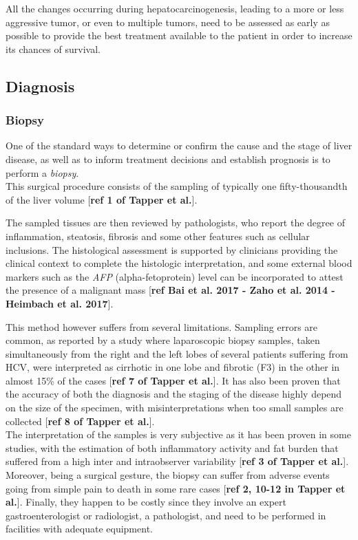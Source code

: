 \documentclass[]{article}
\begin{document}
All the changes occurring during hepatocarcinogenesis, leading to a more
or less aggressive tumor, or even to multiple tumors, need to be
assessed as early as possible to provide the best treatment available to
the patient in order to increase its chances of survival.

\subsection{Diagnosis}\label{diagnosis}

\subsubsection{Biopsy}\label{biopsy}

One of the standard ways to determine or confirm the cause and the stage
of liver disease, as well as to inform treatment decisions and establish
prognosis is to perform a \emph{biopsy}.\\
This surgical procedure consists of the sampling of typically one
fifty-thousandth of the liver volume {[}\textbf{ref 1 of Tapper et
al.}{]}.

The sampled tissues are then reviewed by pathologists, who report the
degree of inflammation, steatosis, fibrosis and some other features such
as cellular inclusions. The histological assessment is supported by
clinicians providing the clinical context to complete the histologic
interpretation, and some external blood markers such as the \emph{AFP}
(alpha-fetoprotein) level can be incorporated to attest the presence of
a malignant mass {[}\textbf{ref Bai et al. 2017 - Zaho et al. 2014 -
Heimbach et al. 2017}{]}.

This method however suffers from several limitations. Sampling errors
are common, as reported by a study where laparoscopic biopsy samples,
taken simultaneously from the right and the left lobes of several
patients suffering from HCV, were interpreted as cirrhotic in one lobe
and fibrotic (F3) in the other in almost 15\% of the cases
{[}\textbf{ref 7 of Tapper et al.}{]}. It has also been proven that the
accuracy of both the diagnosis and the staging of the disease highly
depend on the size of the specimen, with misinterpretations when too
small samples are collected {[}\textbf{ref 8 of Tapper et al.}{]}.\\
The interpretation of the samples is very subjective as it has been
proven in some studies, with the estimation of both inflammatory
activity and fat burden that suffered from a high inter and
intraobserver variability {[}\textbf{ref 3 of Tapper et al.}{]}.
Moreover, being a surgical gesture, the biopsy can suffer from adverse
events going from simple pain to death in some rare cases {[}\textbf{ref
2, 10-12 in Tapper et al.}{]}. Finally, they happen to be costly since
they involve an expert gastroenterologist or radiologist, a pathologist,
and need to be performed in facilities with adequate equipment.
\end{document}
